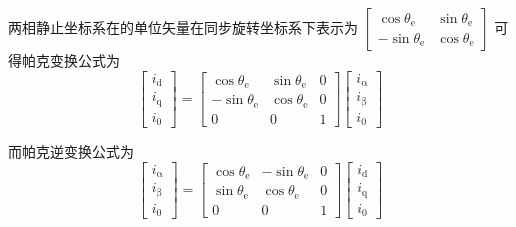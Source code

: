 两相静止坐标系在的单位矢量在同步旋转坐标系下表示为
\(
\begin{bmatrix}
    \cos\theta_{\mathrm{e}}&\sin\theta_{\mathrm{e}}\\-\sin\theta_{\mathrm{e}}&\cos\theta_{\mathrm{e}}
\end{bmatrix}\)
可得帕克变换公式为
\begin{equation}
    \begin{bmatrix}
        i_{\mathrm{d}}\\i_{\mathrm{q}}\\i_{\mathrm{0}}
    \end{bmatrix}
    =
    \begin{bmatrix}
        \cos\theta_{\mathrm{e}}&\sin\theta_{\mathrm{e}}&0
        \\-\sin\theta_{\mathrm{e}}&\cos\theta_{\mathrm{e}}&0
        \\0&0&1
    \end{bmatrix}
    \begin{bmatrix}
        i_{\mathrm{\alpha}}
            \\i_{\mathrm{\beta}}
            \\i_{\mathrm{0}}
    \end{bmatrix}
    \label{eq:帕克变换}
\end{equation}

而帕克逆变换公式为
\begin{equation}
    \begin{bmatrix}
        i_{\mathrm{\alpha}}\\i_{\mathrm{\beta}}\\i_{\mathrm{0}}
    \end{bmatrix}
    =
    \begin{bmatrix}
        \cos\theta_{\mathrm{e}}&-\sin\theta_{\mathrm{e}}&0\\
        \sin\theta_{\mathrm{e}}&\cos\theta_{\mathrm{e}}&0\\
        0&0&1
    \end{bmatrix}
    \begin{bmatrix}
        i_{\mathrm{d}}\\i_{\mathrm{q}}\\i_{\mathrm{0}}
    \end{bmatrix}
    \label{eq:帕克逆变换}
\end{equation}

